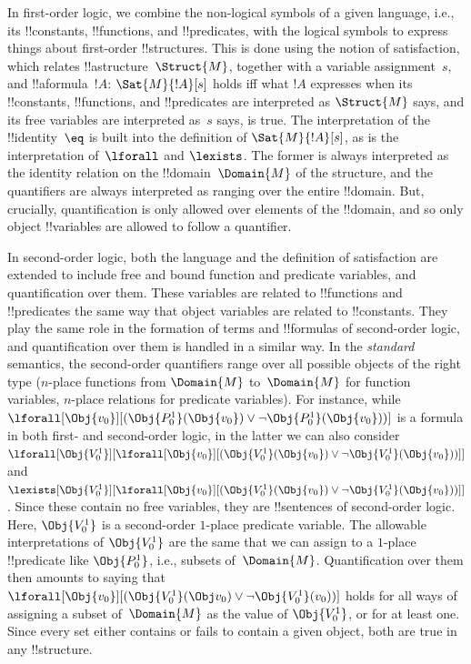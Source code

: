 \documentclass[../../../include/open-logic-section]{subfiles}
\begin{document}


In first-order logic, we combine the non-logical symbols of a given
language, i.e., its !!{constant}s, !!{function}s, and !!{predicate}s,
with the logical symbols to express things about first-order
!!{structure}s.  This is done using the notion of satisfaction, which
relates !!a{structure}~$\Struct{M}$, together with a variable
assignment~$s$, and !!a{formula}~$!A$: $\Sat{M}{!A}[s]$ holds iff what
$!A$ expresses when its !!{constant}s, !!{function}s, and
!!{predicate}s are interpreted as $\Struct{M}$ says, and its free
variables are interpreted as~$s$ says, is true.  The interpretation of
the !!{identity}~$\eq$ is built into the definition of
$\Sat{M}{!A}[s]$, as is the interpretation of~$\lforall$ and
$\lexists$. The former is always interpreted as the identity relation
on the !!{domain}~$\Domain{M}$ of the structure, and the quantifiers
are always interpreted as ranging over the entire !!{domain}.  But,
crucially, quantification is only allowed over elements of the
!!{domain}, and so only object !!{variable}s are allowed to follow a
quantifier.

In second-order logic, both the language and the definition of
satisfaction are extended to include free and bound function and
predicate variables, and quantification over them.  These variables
are related to !!{function}s and !!{predicate}s the same way that
object variables are related to !!{constant}s.  They play the same
role in the formation of terms and !!{formula}s of second-order logic,
and quantification over them is handled in a similar way.  In the
\emph{standard} semantics, the second-order quantifiers range over all
possible objects of the right type ($n$-place functions from
$\Domain{M}$ to~$\Domain{M}$ for function variables, $n$-place
relations for predicate variables).  For instance, while
$\lforall[\Obj{v_0}][(\Obj{P^1_0}(\Obj{v_0}) \lor \lnot
  \Obj{P^1_0}(\Obj{v_0}))]$ is a formula in both first- and second-order
logic, in the latter we can also consider
$\lforall[\Obj{V^1_0}][\lforall[\Obj{v_0}][(\Obj{V^1_0}(\Obj{v_0}) \lor
    \lnot \Obj{V^1_0}(\Obj{v_0}))]]$ and
$\lexists[\Obj{V^1_0}][\lforall[\Obj{v_0}][(\Obj{V^1_0}(\Obj{v_0}) \lor
    \lnot \Obj{V^1_0}(\Obj{v_0}))]]$. Since these contain no free variables,
they are !!{sentence}s of second-order logic. Here, $\Obj{V^1_0}$ is a
second-order $1$-place predicate variable.  The allowable
interpretations of $\Obj{V^1_0}$ are the same that we can assign to a
$1$-place !!{predicate} like $\Obj{P^1_0}$, i.e., subsets
of~$\Domain{M}$.  Quantification over them then amounts to saying that
$\lforall[\Obj{v_0}][(\Obj{V^1_0}(\Obj v_0) \lor \lnot
  \Obj{V^1_0}(v_0))]$ holds for all ways of assigning a subset
of~$\Domain{M}$ as the value of $\Obj{V^1_0}$, or for at least one.
Since every set either contains or fails to contain a given object,
both are true in any !!{structure}.
\end{document}
